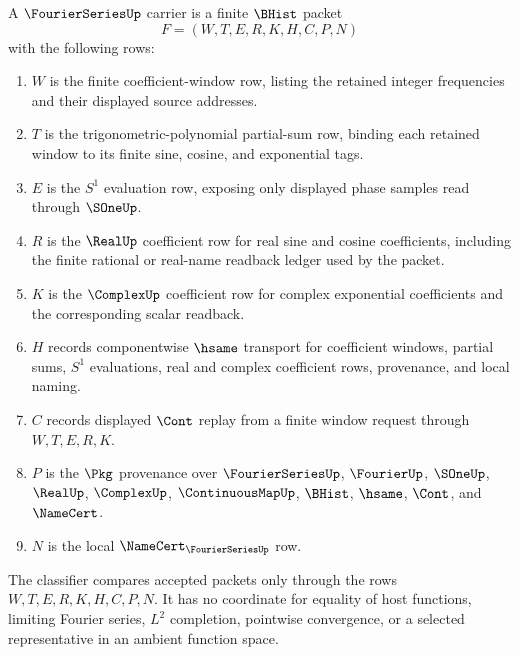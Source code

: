 \begin{definition}
\label{def:fourier-series-carrier}
A $\FourierSeriesUp$ carrier is a finite $\BHist$ packet
$$
F=(W,T,E,R,K,H,C,P,N)
$$
with the following rows:
\begin{enumerate}
\item $W$ is the finite coefficient-window row, listing the retained integer frequencies and their displayed source addresses.
\item $T$ is the trigonometric-polynomial partial-sum row, binding each retained window to its finite sine, cosine, and exponential tags.
\item $E$ is the $S^{1}$ evaluation row, exposing only displayed phase samples read through $\SOneUp$.
\item $R$ is the $\RealUp$ coefficient row for real sine and cosine coefficients, including the finite rational or real-name readback ledger used by the packet.
\item $K$ is the $\ComplexUp$ coefficient row for complex exponential coefficients and the corresponding scalar readback.
\item $H$ records componentwise $\hsame$ transport for coefficient windows, partial sums, $S^{1}$ evaluations, real and complex coefficient rows, provenance, and local naming.
\item $C$ records displayed $\Cont$ replay from a finite window request through $W,T,E,R,K$.
\item $P$ is the $\Pkg$ provenance over $\FourierSeriesUp$, $\FourierUp$, $\SOneUp$, $\RealUp$, $\ComplexUp$, $\ContinuousMapUp$, $\BHist$, $\hsame$, $\Cont$, and $\NameCert$.
\item $N$ is the local $\NameCert_{\FourierSeriesUp}$ row.
\end{enumerate}
The classifier compares accepted packets only through the rows $W,T,E,R,K,H,C,P,N$. It has no coordinate for equality of host functions, limiting Fourier series, $L^{2}$ completion, pointwise convergence, or a selected representative in an ambient function space.
\end{definition}

